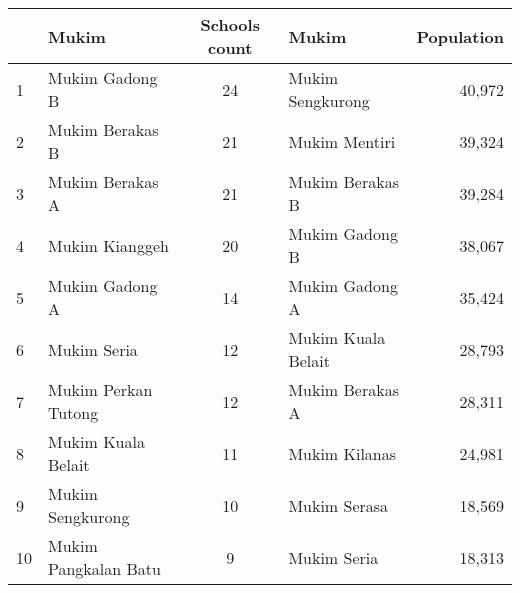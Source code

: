 \documentclass[12pt]{article}
\begin{document}
\begin{table}[]
\centering
\setlength{\tabcolsep}{10pt}
\begin{tabular}{@{}llc|lr@{}}
\toprule
                        & Mukim                                     & Schools count             & Mukim                                     & Population                     \\ \midrule
\multicolumn{1}{l|}{1}  & \cellcolor[HTML]{FFFFC7}Mukim Gadong B     & \cellcolor[HTML]{FFFFC7}24 & \cellcolor[HTML]{FFFFC7}Mukim Sengkurong  & \cellcolor[HTML]{FFFFC7}40,972 \\
\multicolumn{1}{l|}{2}  & \cellcolor[HTML]{FFFFC7}Mukim Berakas B    & \cellcolor[HTML]{FFFFC7}21 & Mukim Mentiri                             & 39,324                         \\
\multicolumn{1}{l|}{3}  & \cellcolor[HTML]{FFFFC7}Mukim Berakas A    & \cellcolor[HTML]{FFFFC7}21 & \cellcolor[HTML]{FFFFC7}Mukim Berakas B   & \cellcolor[HTML]{FFFFC7}39,284 \\
\multicolumn{1}{l|}{4}  & Mukim Kianggeh                             & 20                         & \cellcolor[HTML]{FFFFC7}Mukim Gadong B    & \cellcolor[HTML]{FFFFC7}38,067 \\
\multicolumn{1}{l|}{5}  & \cellcolor[HTML]{FFFFC7}Mukim Gadong A     & \cellcolor[HTML]{FFFFC7}14 & \cellcolor[HTML]{FFFFC7}Mukim Gadong A    & \cellcolor[HTML]{FFFFC7}35,424 \\
\multicolumn{1}{l|}{6}  & \cellcolor[HTML]{FFFFC7}Mukim Seria        & \cellcolor[HTML]{FFFFC7}12 & \cellcolor[HTML]{FFFFC7}Mukim Kuala Belait & \cellcolor[HTML]{FFFFC7}28,793 \\
\multicolumn{1}{l|}{7}  & Mukim Perkan Tutong                        & 12                         & \cellcolor[HTML]{FFFFC7}Mukim Berakas A   & \cellcolor[HTML]{FFFFC7}28,311 \\
\multicolumn{1}{l|}{8}  & \cellcolor[HTML]{FFFFC7}Mukim Kuala Belait & \cellcolor[HTML]{FFFFC7}11 & Mukim Kilanas                             & 24,981                         \\
\multicolumn{1}{l|}{9}  & \cellcolor[HTML]{FFFFC7}Mukim Sengkurong   & \cellcolor[HTML]{FFFFC7}10 & Mukim Serasa                              & 18,569                         \\
\multicolumn{1}{l|}{10} & Mukim Pangkalan Batu                       & 9                          & \cellcolor[HTML]{FFFFC7}Mukim Seria       & \cellcolor[HTML]{FFFFC7}18,313 \\ \bottomrule
\end{tabular}
\end{table}
\end{document}
